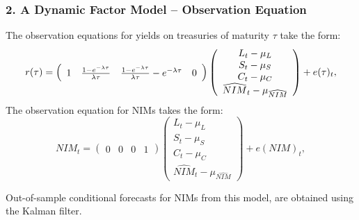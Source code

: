 \documentclass[handout]{beamer}
\begin{document}
\begin{frame}
\frametitle{2. A Dynamic Factor Model -- Observation Equation}

The observation equations for yields on treasuries of maturity $\tau $ take the form:
\begin{equation*}
r(\tau )=\left(
\begin{array}{cccc}
1 & \frac{1-e^{-\lambda \tau }}{\lambda \tau } & \frac{1-e^{-\lambda \tau }}{%
\lambda \tau }-e^{-\lambda \tau } & 0%
\end{array}%
\right) \left(
\begin{array}{c}
{L_{t}-\mu _{L}} \\
{S_{t}-\mu _{S}} \\
{C_{t}-\mu _{C}} \\
\widehat{NIM}_{t}-\mu _{\widehat{NIM}}%
\end{array}%
\right) +e(\tau )_{t},
\end{equation*}%
The observation equation for NIMs takes the form:
\begin{equation*}
NIM_{t}=\left(
\begin{array}{cccc}
0 & 0 & 0 & 1%
\end{array}%
\right) \left(
\begin{array}{c}
{L_{t}-\mu _{L}} \\
{S_{t}-\mu _{S}} \\
{C_{t}-\mu _{C}} \\
\widehat{NIM}_{t}-\mu _{\widehat{NIM}}%
\end{array}%
\right) +e(NIM)_{t},
\end{equation*}

Out-of-sample conditional forecasts for NIMs from this model, are obtained
using the Kalman filter.

\end{frame}
\end{document}
